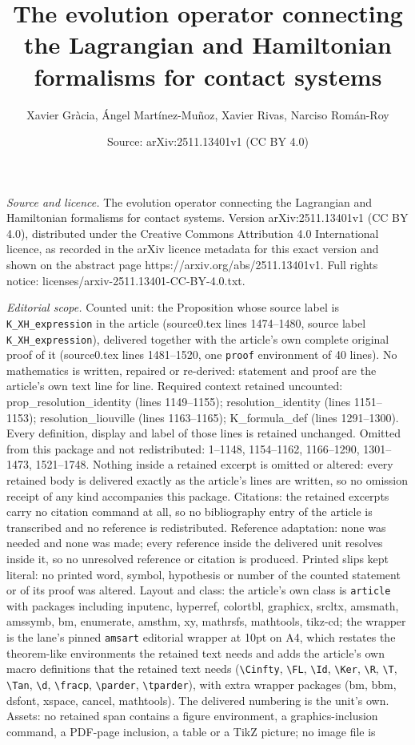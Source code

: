 \documentclass[10pt,a4paper]{amsart}
\title[The evolution operator connecting the Lagrangian and Hamilto]{The evolution operator connecting the Lagrangian and Hamiltonian formalisms for contact systems}
\author{Xavier Gr\`acia, \'Angel Mart\'inez-Mu\~noz, Xavier Rivas, Narciso Rom\'an-Roy}
\date{Source: arXiv:2511.13401v1 (CC BY 4.0)}
\begin{document}
\maketitle

\noindent\emph{Source and licence.} The evolution operator connecting the Lagrangian and Hamiltonian formalisms for contact systems. Version arXiv:2511.13401v1 (CC BY 4.0), distributed under the Creative Commons Attribution 4.0 International licence, as recorded in the arXiv licence metadata for this exact version and shown on the abstract page https://arxiv.org/abs/2511.13401v1. Full rights notice: licenses/arxiv-2511.13401-CC-BY-4.0.txt.\par\smallskip

\noindent\textit{Editorial scope.} Counted unit: the Proposition whose source label is \texttt{K\_XH\_expression} in the article (source0.tex lines 1474--1480, source label \texttt{K\_XH\_expression}), delivered together with the article's own complete original proof of it (source0.tex lines 1481--1520, one \texttt{proof} environment of 40 lines). No mathematics is written, repaired or re-derived: statement and proof are the article's own text line for line. Required context retained uncounted: prop\_resolution\_identity (lines 1149--1155); resolution\_identity (lines 1151--1153); resolution\_liouville (lines 1163--1165); K\_formula\_def (lines 1291--1300). Every definition, display and label of those lines is retained unchanged. Omitted from this package and not redistributed: 1--1148, 1154--1162, 1166--1290, 1301--1473, 1521--1748. Nothing inside a retained excerpt is omitted or altered: every retained body is delivered exactly as the article's lines are written, so no omission receipt of any kind accompanies this package. Citations: the retained excerpts carry no citation command at all, so no bibliography entry of the article is transcribed and no reference is redistributed. Reference adaptation: none was needed and none was made; every reference inside the delivered unit resolves inside it, so no unresolved reference or citation is produced. Printed slips kept literal: no printed word, symbol, hypothesis or number of the counted statement or of its proof was altered. Layout and class: the article's own class is \texttt{article} with packages including inputenc, hyperref, colortbl, graphicx, srcltx, amsmath, amssymb, bm, enumerate, amsthm, xy, mathrsfs, mathtools, tikz-cd; the wrapper is the lane's pinned \texttt{amsart} editorial wrapper at 10pt on A4, which restates the theorem-like environments the retained text needs and adds the article's own macro definitions that the retained text needs (\texttt{\textbackslash Cinfty}, \texttt{\textbackslash FL}, \texttt{\textbackslash Id}, \texttt{\textbackslash Ker}, \texttt{\textbackslash R}, \texttt{\textbackslash T}, \texttt{\textbackslash Tan}, \texttt{\textbackslash d}, \texttt{\textbackslash fracp}, \texttt{\textbackslash parder}, \texttt{\textbackslash tparder}), with extra wrapper packages (bm, bbm, dsfont, xspace, cancel, mathtools). The delivered numbering is the unit's own. Assets: no retained span contains a figure environment, a graphics-inclusion command, a PDF-page inclusion, a table or a TikZ picture; no image file is 
\end{document}
